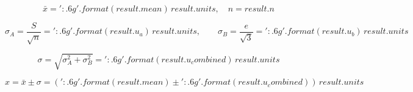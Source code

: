 \documentclass[11pt,a4paper]{ctexart}
\begin{document}
{{{{{{{{{{{                        \[
                        \bar{x} = {{ '{:.6g}'.format(result.mean) }}\,{{ result.units }},\quad n = {{ result.n }}
                        \]
                        
                        \[
                        \sigma_A = \frac{S}{\sqrt{n}} = {{ '{:.6g}'.format(result.u_a) }}\,{{ result.units }},\qquad 
                        \sigma_B = \frac{e}{\sqrt{3}} = {{ '{:.6g}'.format(result.u_b) }}\,{{ result.units }}
                        \]
                        
                        \[
                        \sigma = \sqrt{\sigma_A^2 + \sigma_B^2} = {{ '{:.6g}'.format(result.u_combined) }}\,{{ result.units }}
                        \]
                        
                        \[
                        x = \bar{x} \pm \sigma = ({{ '{:.6g}'.format(result.mean) }} \pm {{ '{:.6g}'.format(result.u_combined) }})\,{{ result.units }}
                        \]
                    {%
}}}}}}}}}}}}
\end{document}
